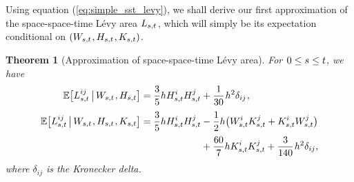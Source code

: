 \documentclass[sn-mathphys-num]{sn-jnl}%
\newtheorem{theorem}{Theorem}%
\newcommand{\E}{\mathbb{E}}
\newcommand{\m}{\hspace{0.25mm}}
\begin{document}
Using equation (\ref{eq:simple_sst_levy}), we shall derive our first approximation of the space-space-time L\'{e}vy area $L_{s,t}\m$, which will simply be its expectation conditional on $(W_{s,t}\m, H_{s,t}\m, K_{s,t})$.\medbreak
\begin{theorem}[Approximation of space-space-time L\'{e}vy area]\label{thm:sst_approx_whk} For $\m 0\leq s\leq t$, we have
\begin{align}
\E\big[L_{s,t}^{ij}\,\big|\, W_{s,t}\m, H_{s,t}\big] = \frac{3}{5}h H_{s,t}^i H_{s,t}^j & + \frac{1}{30}\m h^2\delta_{ij}\m,\label{eq:sst_wh_exp}\\[3pt]
\E\big[L_{s,t}^{ij}\,\big|\, W_{s,t}\m, H_{s,t}\m, K_{s,t}\big] =  \frac{3}{5}h H_{s,t}^i H_{s,t}^j & - \frac{1}{2}h\big(W_{s,t}^i K_{s,t}^j + K_{s,t}^i W_{s,t}^j\big)\label{eq:sst_whk_exp}\\[2pt]
& + \frac{60}{7}h K_{s,t}^i K_{s,t}^j + \frac{3}{140}\m h^2\delta_{ij},\nonumber
\end{align}
where $\delta_{ij}$ is the Kronecker delta. 
\end{theorem}
\end{document}
